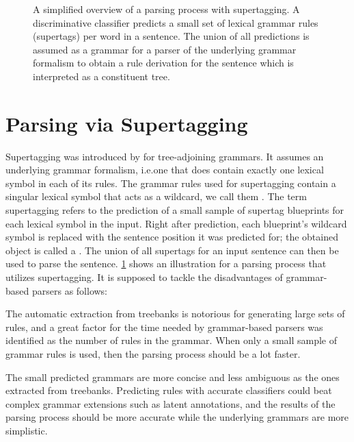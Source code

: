 \documentclass[../document.tex]{subfiles}
\begin{document}
    \begin{figure}
        \resizebox{\linewidth}{!}{}
        \caption{\label{fig:supertagging}
            A simplified overview of a parsing process with supertagging.
            A discriminative classifier predicts a small set of lexical grammar rules (supertags) per word in a sentence.
            The union of all predictions is assumed as a grammar for a parser of the underlying grammar formalism to obtain a rule derivation for the sentence which is interpreted as a constituent tree.
        }
    \end{figure}
    
    \section*{Parsing via Supertagging}
    Supertagging was introduced by \citet{bangalore1999supertagging} for tree-adjoining grammars.
    It assumes an underlying  grammar formalism, i.e.\@ one that does contain exactly one lexical symbol in each of its rules.
    The grammar rules used for supertagging contain a singular lexical symbol that acts as a wildcard, we call them .
    The term supertagging refers to the prediction of a small sample of supertag blueprints for each lexical symbol in the input.
    Right after prediction, each blueprint's wildcard symbol is replaced with the sentence position it was predicted for; the obtained object is called a .
    The union of all supertags for an input sentence can then be used to parse the sentence.
    \cref{fig:supertagging} shows an illustration for a parsing process that utilizes supertagging.
    It is supposed to tackle the disadvantages of grammar-based parsers as follows:
    \begin{compactitem}
        \item The automatic extraction from treebanks is notorious for generating large sets of rules, and a great factor for the time needed by grammar-based parsers was identified as the number of rules in the grammar. \cite{dunlop2010reducing}
            When only a small sample of grammar rules is used, then the parsing process should be a lot faster.
        \item The small predicted grammars are more concise and less ambiguous as the ones extracted from treebanks.
            Predicting rules with accurate classifiers could beat complex grammar extensions such as latent annotations, and the results of the parsing process should be more accurate while the underlying grammars are more simplistic.
    \end{compactitem}
\end{document}
